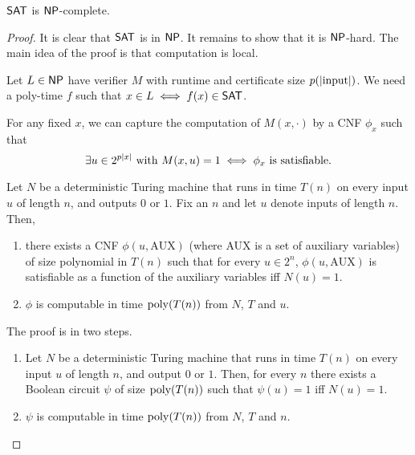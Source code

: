 \begin{theorem} \label{thm:clt}
    $\mathsf{SAT}$ is $\mathsf{NP}$-complete.
\end{theorem}
\begin{proof}
    It is clear that $\mathsf{SAT}$ is in $\mathsf{NP}$.
    It remains to show that it is $\mathsf{NP}$-hard.
    The main idea of the proof is that computation is local.

    Let $L \in \mathsf{NP}$ have verifier $M$ with runtime and certificate size
    $p(\lvert\text{input}\rvert)$.
    We need a poly-time $f$ such that $x \in L \iff f(x) \in \mathsf{SAT}$.

    For any fixed $x$, we can capture the computation of $M(x, \cdot)$ by
    a CNF $\phi_x$ such that \[
        \exists u \in 2^{p\abs{x}} \text{ with } M(x, u) = 1
            \iff \phi_x \text{ is satisfiable}.
    \]
    \begin{claim}
        Let $N$ be a deterministic Turing machine that runs in time $T(n)$
        on every input $u$ of length $n$, and outputs $0$ or $1$.
        Fix an $n$ and let $u$ denote inputs of length $n$.
        Then,
        \begin{enumerate}
            \item there exists a CNF $\phi(u, \text{AUX})$
            (where AUX is a set of auxiliary variables)
            of size polynomial in $T(n)$ such that for every
            $u \in 2^n$, $\phi(u, \text{AUX})$ is satisfiable as a
            function of the auxiliary variables iff $N(u) = 1$.
            \item $\phi$ is computable in time $\operatorname{poly}(T(n))$ from $N$, $T$
            and $u$.
        \end{enumerate}
    \end{claim}
    \begin{subproof}
        The proof is in two steps.
        \begin{enumerate}[label=(Step \arabic*)]
            \item Let $N$ be a deterministic Turing machine that runs in time
            $T(n)$ on every input $u$ of length $n$, and output $0$ or $1$.
            Then, for every $n$ there exists a Boolean circuit $\psi$ of
            size $\operatorname{poly}(T(n))$ such that $\psi(u) = 1$ iff $N(u) = 1$.
            \item $\psi$ is computable in time $\operatorname{poly}(T(n))$ from $N$, $T$
            and $n$.
        \end{enumerate}


\end{subproof}
\end{proof}
